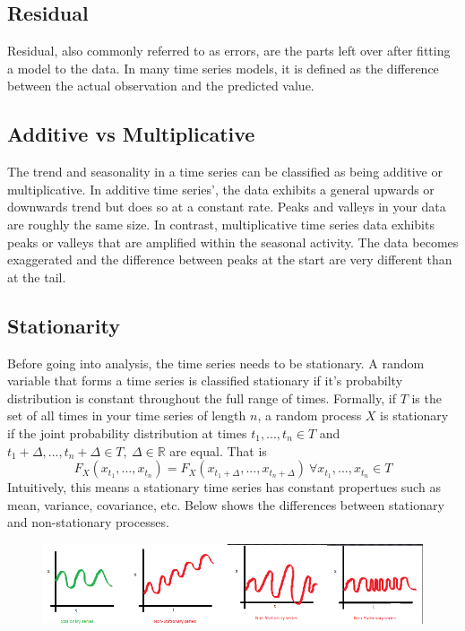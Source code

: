 \documentclass{article}
\begin{document}
  \subsection{Residual}
  Residual, also commonly referred to as errors, are the parts left over after fitting a model to the data. In many time series models, it is defined as the difference between the actual observation and the predicted value.
  
  \subsection{Additive vs Multiplicative}
  The trend and seasonality in a time series can be classified as being additive or multiplicative.
  In additive time series', the data exhibits a general upwards or downwards trend but does so at a constant rate. Peaks and valleys in your data are roughly the same size.
  In contrast, multiplicative time series data exhibits peaks or valleys that are amplified within the seasonal activity. The data becomes exaggerated and the difference between peaks at the start are very different than at the tail.
  \newpage
  \subsection{Stationarity}
  Before going into analysis, the time series needs to be stationary.
  A random variable that forms a time series is classified stationary if it's probabilty distribution is constant throughout the full range of times. 
  Formally, if $T$ is the set of all times in your time series of length $n$, a random process $X$ is stationary if the joint probability distribution at times $t_1,...,t_n \in T$ and $t_1+\Delta,...,t_n+\Delta \in T,\  \Delta \in \mathbb{R}$ are equal. That is
  \begin{equation*}
    F_{X}(x_{t_1},...,x_{t_n}) = F_{X}(x_{{t_1}+\Delta},...,x_{{t_n}+\Delta})\ \forall x_{t_1},...,x_{t_n} \in T
  \end{equation*}
  Intuitively, this means a stationary time series has constant propertues such as mean, variance, covariance, etc. Below shows the differences between stationary and non-stationary processes.
  \begin{figure}[H]
    \centering
    \includegraphics[scale=0.8]{stationary_time_series.png}
    \caption{}
  \end{figure}
\end{document}
